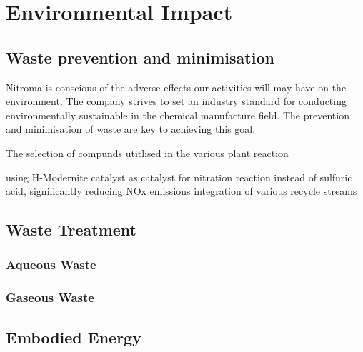 \section{Environmental Impact}

\subsection{Waste prevention and minimisation }

Nitroma is conscious of the adverse effects our activities will may have on the environment. The company strives to set an industry standard for conducting environmentally sustainable in the chemical manufacture field. The prevention and minimisation of waste are key to achieving this goal. 

The selection of compunds utitlised in the various plant reaction 

   
    
    
    using H-Modernite catalyst as catalyst for nitration reaction instead of sulfuric acid, significantly reducing NOx emissions
  integration of various recycle streams


\subsection{Waste Treatment}

\subsubsection{Aqueous Waste}


\subsubsection{Gaseous Waste}

\subsection{Embodied Energy}